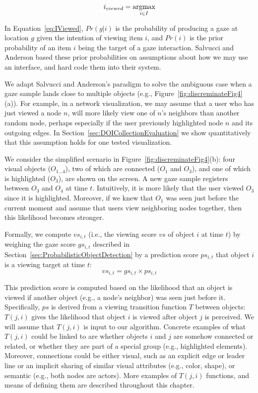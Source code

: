 \begin{equation}
i_{viewed} = \displaystyle \argmax_{i\in I}%
\label{eq:IViewed}
\end{equation}

In Equation~\ref{eq:IViewed}, $Pr(g|i)$ is the probability of producing a gaze at location $g$ given the intention of viewing item $i$, and $Pr(i)$ is the prior probability of an item $i$  being the target of a gaze interaction. Salvucci and Anderson based these prior probabilities on assumptions about how we may use an interface, and hard code them into their system.  

We adapt Salvucci and Anderson's paradigm to solve the ambiguous case when a gaze sample lands close to multiple objects (e.g.,  Figure~\ref{fig:discreminateFig4}(a)). For example, in a network visualization, we may assume that a user who has just viewed a node $n$, will more likely view one of $n$'s neighbors than another random node, perhaps especially if the user previously highlighted node $n$ and its outgoing edges.  In Section~\ref{sec:DOICollectionEvaluation} we show quantitatively that this assumption holds for one tested visualization.  

We consider the simplified scenario in Figure~\ref{fig:discreminateFig4}(b): four visual objects ($O_{1\ldots 4}$), two of which are connected ($O_1$ and $O_3$), and one of which is highlighted ($O_3$), are shown on the screen. A new gaze sample registers between $O_3$ and $O_4$ at time $t$. Intuitively, it is more likely that the user viewed $O_3$ since it is highlighted. Moreover, if we knew that $O_1$ was seen just before the current moment and assume that users view neighboring nodes together, then this likelihood becomes stronger.         
 
Formally, we compute $vs_{i,t}$  (i.e., the viewing score $vs$ of object $i$ at time $t$) by weighing the gaze score $gs_{i,t}$ described in Section~\ref{sec:ProbabilisticObjectDetection} by a prediction score $ps_{i,t}$ that object $i$ is a viewing target at time $t$:  
\begin{equation}
vs_{i,t} = gs_{i,t} \times ps_{i,t}
\label{eq:VS}
\end{equation}

This prediction score is computed based on the likelihood that an object is viewed if another object (e.g.,  a node's neighbor) was seen just before it. Specifically, $ps$ is derived from a viewing transition function $T$ between objects:  $T(j,i)$ gives the likelihood that object $i$ is viewed after object $j$ is perceived. We will assume that $T(j, i)$ is input to our algorithm. Concrete examples of what $T(j, i)$ could be linked to are whether objects $i$ and $j$ are somehow connected or related, or whether they are part of a special group (e.g., highlighted elements). Moreover, connections could be either visual, such as an explicit edge or leader line or an implicit sharing of similar visual attributes (e.g., color, shape), or semantic (e.g., both nodes are actors). More examples of $T(j, i)$ functions, and means of defining them are described throughout this chapter.

